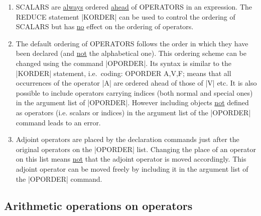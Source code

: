 \begin{enumerate}

\item SCALARS are \underline{always} ordered \underline{ahead} of
OPERATORS in an expression.
The REDUCE statement |KORDER|  can be used to control the
ordering of SCALARS  but has \underline{no}
effect on the ordering of operators.

\item The default ordering of OPERATORS follows the order
in which they have been declared (and \underline{not}
the alphabetical one).
This ordering scheme can be changed using the command |OPORDER|.
Its syntax is similar to the |KORDER| statement, i.e.\ coding:
\begintt
OPORDER A,V,F;
\endtt
means that all occurrences of the operator |A| are ordered ahead of
those of |V| etc. It is also possible to include operators
carrying
indices (both normal and special ones) in the argument list of
|OPORDER|. However including objects  \underline{not}
defined as operators (i.e. scalars or indices) in the argument list
of the |OPORDER| command leads to an error.

\item Adjoint operators are placed by the declaration commands just
after the original operators on the |OPORDER| list. Changing the
place of an operator on this list means \underline{not} that the
adjoint operator is moved accordingly. This adjoint operator can
be moved freely  by including it in the argument list of the
|OPORDER| command.
 \end{enumerate}

\subsection{Arithmetic operations on operators}

